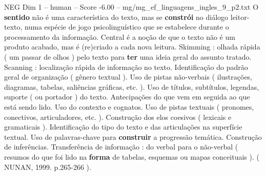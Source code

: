 \begin{textsample}{NEG Dim 1 – human – Score -6.00 – mg/mg\_ef\_linguagens\_ingles\_9\_p2.txt}  \label{ex:f1_neg_015}
O \textbf{sentido} não é uma característica do texto, mas se \textbf{constrói} no diálogo leitor-texto, numa espécie de jogo psicolinguístico que se estabelece durante o processamento da informação.
Central é a noção de que o texto não é um produto acabado, mas é (re)criado a cada nova leitura.
Skimming : olhada rápida ( um passar de olhos ) pelo texto para \textbf{ter} uma ideia geral do assunto tratado.
Scanning : localização rápida de informação no texto.
Identificação do padrão geral de organização ( gênero textual ).
Uso de pistas não-verbais ( ilustrações, diagramas, tabelas, saliências gráficas, etc. ).
Uso de títulos, subtítulos, legendas, suporte ( ou portador ) do texto.
Antecipações do que vem em seguida ao que está sendo lido.
Uso do contexto e cognatos.
Uso de pistas textuais ( pronomes, conectivos, articuladores, etc. ).
Construção dos elos coesivos ( lexicais e gramaticais ).
Identificação do tipo do texto e das articulações na superfície textual.
Uso de palavras-chave para \textbf{construir} a progressão temática.
Construção de inferências.
Transferência de informação : do verbal para o não-verbal ( resumos do que foi lido na \textbf{forma} de tabelas, esquemas ou mapas conceituais ). ( NUNAN, 1999. p.265-266 ).

\end{textsample}
